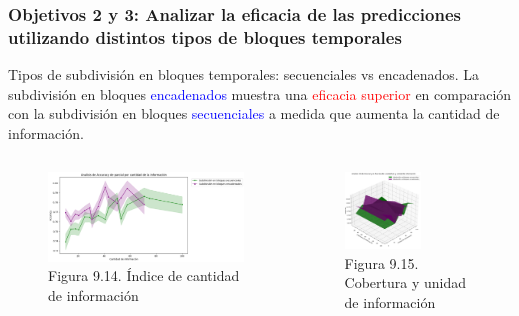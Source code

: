 \documentclass{beamer}
\begin{document}
\begin{frame}
	\frametitle{Objetivos 2 y 3: Analizar la eficacia de las predicciones utilizando distintos tipos de bloques temporales}
\begin{block}{Tipos de subdivisión en bloques temporales: secuenciales vs encadenados.}
	La subdivisión en bloques \textcolor{blue}{encadenados} muestra una \textcolor{red}{eficacia superior} en comparación con la subdivisión en bloques \textcolor{blue}{secuenciales} a medida que aumenta la cantidad de información.
	\end{block}
	
	\begin{columns}[c]
	\begin{column}{.5\textwidth}
		\begin{figure}
			\centering
			\includegraphics[width=1\textwidth]{figs/cap7/figura_17}
\caption{Figura 9.14. Índice de cantidad de información}
		\end{figure}      
	\end{column}
	\begin{column}{.5\textwidth}
		\begin{figure}
			\centering
			\includegraphics[width=0.6\textwidth]{figs/cap7/figura_18}
			\caption{Figura 9.15. Cobertura y unidad de información}
		\end{figure}
	\end{column}
\end{columns}
	
\end{frame}
\end{document}
